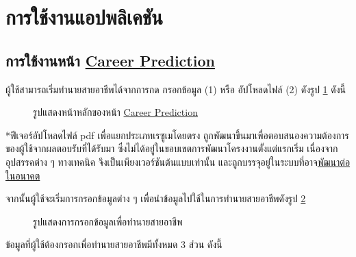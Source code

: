 \section{การใช้งานแอปพลิเคชัน}
\subsection{การใช้งานหน้า \hyperref[subsec:Career Prediction]{Career Prediction}}
ผู้ใช้สามารถเริ่มทำนายสายอาชีพได้จากการกด กรอกข้อมูล (1) หรือ อัปโหลดไฟล์ (2) ดังรูป \ref{fig:start-CP} ดังนี้
\begin{figure}[H]\centering
    \caption{รูปแสดงหน้าหลักของหน้า \hyperref[subsec:Career Prediction]{Career Prediction}}\label{fig:start-CP}
\end{figure}
*ฟีเจอร์อัปโหลดไฟล์ pdf เพื่อแยกประเภทเรซูเมโดยตรง ถูกพัฒนาขึ้นมาเพื่อตอบสนองความต้องการของผู้ใช้จากผลตอบรับที่ได้รับมา 
ซึ่งไม่ได้อยู่ในขอบเขตการพัฒนาโครงงานตั้งแต่แรกเริ่ม เนื่องจากอุปสรรคต่าง ๆ ทางเทคนิค จึงเป็นเพียงเวอร์ชันต้นแบบเท่านั้น และถูกบรรจุอยู่ในระบบที่อาจ\hyperref[subsec:Future Plan OCR]{พัฒนาต่อในอนาคต}

จากนั้นผู้ใช้จะเริ่มการกรอกข้อมูลต่าง ๆ เพื่อนำข้อมูลไปใช้ในการทำนายสายอาชีพดังรูป \ref{fig:input-CP} 
\begin{figure}[H]\centering
    \caption{รูปแสดงการกรอกข้อมูลเพื่อทำนายสายอาชีพ}\label{fig:input-CP}
\end{figure}
ข้อมูลที่ผู้ใช้ต้องกรอกเพื่อทำนายสายอาชีพมีทั้งหมด 3 ส่วน ดังนี้


